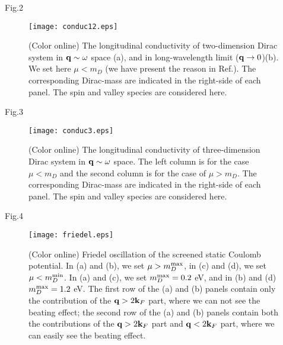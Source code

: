 \documentclass[UTF8,a4paper]{article}
\begin{document}
\clearpage
Fig.2
\begin{figure}[!ht]
   \centering
 \centering
   \begin{center}
     \texttt{[image: conduc12.eps]}
\caption{(Color online) The longitudinal conductivity of two-dimension Dirac system in ${\bf q}\sim\omega$ space (a),
and in long-wavelength limit (${\bf q}\rightarrow 0$)(b).
We set here $\mu<m_{D}$ (we have present the reason in Ref.\cite{Wu C H_3}).
The corresponding Dirac-mass are indicated in the right-side of each panel.
The spin and valley species are considered here.
}
   \end{center}
\end{figure}
\clearpage
Fig.3
\begin{figure}[!ht]
   \centering
 \centering
   \begin{center}
     \texttt{[image: conduc3.eps]}
\caption{(Color online) The longitudinal conductivity of three-dimension Dirac system in ${\bf q}\sim\omega$ space.
The left column is for the case $\mu<m_{D}$
and the second column is for the case of $\mu>m_{D}$.
The corresponding Dirac-mass are indicated in the right-side of each panel.
The spin and valley species are considered here.
}
   \end{center}
\end{figure}

\clearpage
Fig.4
\begin{figure}[!ht]
   \centering
 \centering
   \begin{center}
     \texttt{[image: friedel.eps]}
\caption{(Color online) Friedel oscillation of the screened static Coulomb potential.
In (a) and (b), we set $\mu>m_{D}^{{\rm max}}$,
in (c) and (d), we set $\mu<m_{D}^{{\rm min}}$.
In (a) and (c), we set $m_{D}^{{\rm max}}=0.2$ eV, and in (b) and (d) $m_{D}^{{\rm max}}=1.2$ eV.
The first row of the (a) and (b) panels contain only the contribution of the ${\bf q}>2{\bf k}_{F}$ part,
where we can not see the beating effect;
the second row of the (a) and (b) panels contain both the contributions of the ${\bf q}>2{\bf k}_{F}$ part and ${\bf q}<2{\bf k}_{F}$ part,
where we can easily see the beating effect.
}
   \end{center}
\end{figure}
\end{document}
